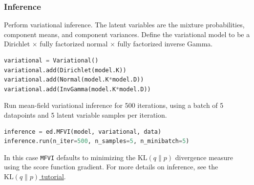 \subsubsection{Inference}
Perform variational inference.
%
The latent variables are the mixture probabilities,
component means, and component variances.
Define the variational model to be a Dirichlet $\times$ fully factorized normal
$\times$ fully factorized inverse Gamma.
%
\begin{lstlisting}[language=Python]
variational = Variational()
variational.add(Dirichlet(model.K))
variational.add(Normal(model.K*model.D))
variational.add(InvGamma(model.K*model.D))
\end{lstlisting}

Run mean-field variational inference for 500 iterations, using a batch
of 5 datapoints and 5 latent variable samples per iteration.
\begin{lstlisting}[language=Python]
inference = ed.MFVI(model, variational, data)
inference.run(n_iter=500, n_samples=5, n_minibatch=5)
\end{lstlisting}
In this case
\texttt{MFVI} defaults to minimizing the
$\text{KL}(q\|p)$ divergence measure using the score function
gradient.
For more details on inference, see the \href{tut_KLqp.html}{$\text{KL}(q\|p)$ tutorial}.




